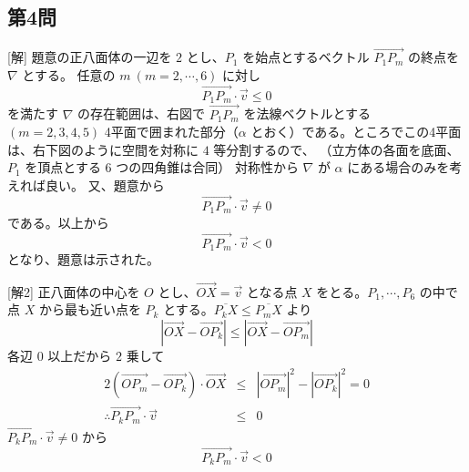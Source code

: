 \documentclass[../main.tex]{subfiles}
\begin{document}
\subsection*{第4問}
[解] 題意の正八面体の一辺を $2$ とし、$P_1$ を始点とするベクトル $\overrightarrow{P_1 P_m}$ の終点を $\nabla$ とする。
任意の $m \ (m=2,\cdots,6)$ に対し
\[ \overrightarrow{P_1 P_m} \cdot \vec{v} \le 0 \]
を満たす $\nabla$ の存在範囲は、右図で $\overrightarrow{P_1 P_m}$ を法線ベクトルとする $(m=2,3,4,5)$ 4平面で囲まれた部分（$\alpha$ とおく）である。ところでこの4平面は、右下図のように空間を対称に $4$ 等分割するので、
（立方体の各面を底面、$P_1$ を頂点とする $6$ つの四角錐は合同）
対称性から $\nabla$ が $\alpha$ にある場合のみを考えれば良い。
又、題意から
\[ \overrightarrow{P_1 P_m} \cdot \vec{v} \neq 0 \]
である。以上から
\[ \overrightarrow{P_1 P_m} \cdot \vec{v} < 0 \]
となり、題意は示された。

\begin{center}
\end{center}

[解2] 正八面体の中心を $O$ とし、$\overrightarrow{OX} = \vec{v}$ となる点 $X$ をとる。$P_1, \cdots, P_6$ の中で点 $X$ から最も近い点を $P_k$ とする。$\overline{P_k X} \le \overline{P_m X}$ より
\[ |\overrightarrow{OX} - \overrightarrow{OP_k}| \le |\overrightarrow{OX} - \overrightarrow{OP_m}| \]
各辺 $0$ 以上だから $2$ 乗して
\begin{eqnarray*}
  2 (\overrightarrow{OP_m} - \overrightarrow{OP_k}) \cdot \overrightarrow{OX} &\le& |\overrightarrow{OP_m}|^2 - |\overrightarrow{OP_k}|^2 = 0 \\
  \therefore \overrightarrow{P_k P_m} \cdot \vec{v} &\le& 0
\end{eqnarray*}
$\overrightarrow{P_k P_m} \cdot \vec{v} \neq 0$ から
\[ \overrightarrow{P_k P_m} \cdot \vec{v} < 0 \]
\end{document}
